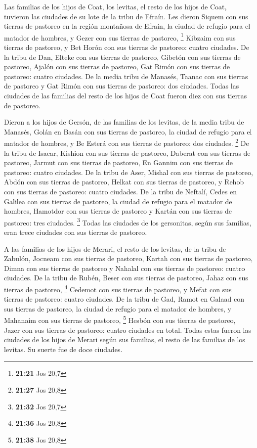  Las familias de los hijos de Coat, los levitas, el resto
de los hijos de Coat, tuvieron las ciudades de su lote de la tribu de
Efraín.  Les dieron Siquem con sus tierras de pastoreo en
la región montañosa de Efraín, la ciudad de refugio para el matador de
hombres, y Gezer con sus tierras de pastoreo, \footnote{\textbf{21:21}
  Jos 20,7}  Kibzaim con sus tierras de pastoreo, y Bet
Horón con sus tierras de pastoreo: cuatro ciudades.  De
la tribu de Dan, Elteke con sus tierras de pastoreo, Gibetón con sus
tierras de pastoreo,  Ajalón con sus tierras de pastoreo,
Gat Rimón con sus tierras de pastoreo: cuatro ciudades. 
De la media tribu de Manasés, Taanac con sus tierras de pastoreo y Gat
Rimón con sus tierras de pastoreo: dos ciudades.  Todas
las ciudades de las familias del resto de los hijos de Coat fueron diez
con sus tierras de pastoreo.

 Dieron a los hijos de Gersón, de las familias de los
levitas, de la media tribu de Manasés, Golán en Basán con sus tierras de
pastoreo, la ciudad de refugio para el matador de hombres, y Be Esterá
con sus tierras de pastoreo: dos ciudades. \footnote{\textbf{21:27} Jos
  20,8}  De la tribu de Isacar, Kishion con sus tierras
de pastoreo, Daberat con sus tierras de pastoreo,  Jarmut
con sus tierras de pastoreo, En Gannim con sus tierras de pastoreo:
cuatro ciudades.  De la tribu de Aser, Mishal con sus
tierras de pastoreo, Abdón con sus tierras de pastoreo, 
Helkat con sus tierras de pastoreo, y Rehob con sus tierras de pastoreo:
cuatro ciudades.  De la tribu de Neftalí, Cedes en
Galilea con sus tierras de pastoreo, la ciudad de refugio para el
matador de hombres, Hamotdor con sus tierras de pastoreo y Kartán con
sus tierras de pastoreo: tres ciudades. \footnote{\textbf{21:32} Jos
  20,7}  Todas las ciudades de los gersonitas, según sus
familias, eran trece ciudades con sus tierras de pastoreo.

 A las familias de los hijos de Merari, el resto de los
levitas, de la tribu de Zabulón, Jocneam con sus tierras de pastoreo,
Kartah con sus tierras de pastoreo,  Dimna con sus
tierras de pastoreo y Nahalal con sus tierras de pastoreo: cuatro
ciudades.  De la tribu de Rubén, Beser con sus tierras de
pastoreo, Jahaz con sus tierras de pastoreo, \footnote{\textbf{21:36}
  Jos 20,8}  Cedemot con sus tierras de pastoreo, y Mefat
con sus tierras de pastoreo: cuatro ciudades.  De la
tribu de Gad, Ramot en Galaad con sus tierras de pastoreo, la ciudad de
refugio para el matador de hombres, y Mahanaim con sus tierras de
pastoreo, \footnote{\textbf{21:38} Jos 20,8}  Hesbón con
sus tierras de pastoreo, Jazer con sus tierras de pastoreo: cuatro
ciudades en total.  Todas estas fueron las ciudades de
los hijos de Merari según sus familias, el resto de las familias de los
levitas. Su suerte fue de doce ciudades.

